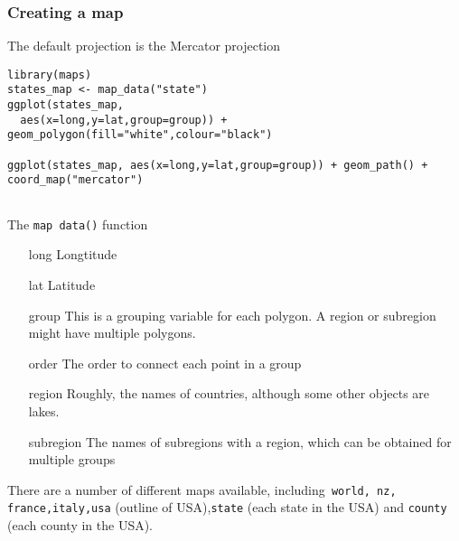 \documentclass{beamer}
\begin{document}
%





\begin{frame}[fragile]
\frametitle{Creating a map}

The default projection is the Mercator projection

\begin{framed}
\begin{verbatim}
library(maps)
states_map <- map_data("state")
ggplot(states_map, 
  aes(x=long,y=lat,group=group)) + 
geom_polygon(fill="white",colour="black")

ggplot(states_map, aes(x=long,y=lat,group=group)) + geom_path() + coord_map("mercator")


\end{verbatim}
\end{framed}
\end{frame}
\begin{frame}
The \texttt{map data()} function

\begin{itemize}
\item[long] Longtitude
\item[lat] Latitude
\item[group] This is a grouping variable for each polygon. A region or subregion might have multiple polygons.
\item[order] The order to connect each point in a group
\item[region] Roughly, the names of countries, although some other objects are lakes.
\item[subregion] The names of subregions with a region, which can be obtained for multiple groups
\end{itemize}
There are a number of different maps available, including\texttt{ world, nz, france,italy,usa} (outline of USA),\texttt{state} (each state in the USA) and \texttt{county }(each county in the USA).
\end{frame}
\end{document}
